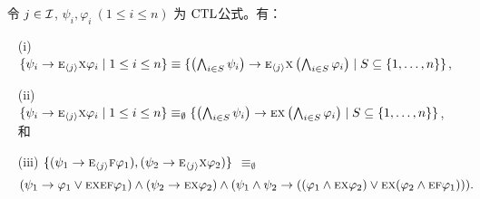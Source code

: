 \begin{lemma}~\label{lem:In2NI}
	令 $j\in {\cal I}$, $\psi_i,\varphi_i~(1\le i\le n)$ 为 $\textrm{CTL}$公式。有：
	\begin{itemize}
		\item[(i)] $\{\psi_i\rightarrow \textsc{e}_{{\langle{j}\rangle}} \textsc{x} \varphi_i \mid 1\le i\le n\}\equiv 
		\{\left(\bigwedge_{i\in S}\psi_i\right)\rightarrow \textsc{e}_{{\langle{j}\rangle}} \textsc{x} \left(\bigwedge_{i\in S}\varphi_i\right)\mid S\subseteq\{1,\dots, n\}\}$,
		
		\item[(ii)] $\{\psi_i\rightarrow \textsc{e}_{{\langle{j}\rangle}} \textsc{x} \varphi_i \mid 1\le i\le n\}\equiv_\emptyset
		\{\left(\bigwedge_{i\in S}\psi_i\right)\rightarrow \textsc{e} \textsc{x} \left(\bigwedge_{i\in S}\varphi_i\right)\mid S\subseteq\{1,\dots, n\}\}$, 和
		
		\item[(iii)] $\{(\psi_1 \rightarrow \textsc{e}_{{\langle{j}\rangle}}\textsc{f} \varphi_1), (\psi_2 \rightarrow \textsc{e}_{{\langle{j}\rangle}}\textsc{x} \varphi_2)\}$
		$\equiv_\emptyset$ 
		\begin{equation*}
			(\psi_1 \rightarrow \varphi_1 \vee \textsc{e} \textsc{x} \textsc{e} \textsc{f} \varphi_1)
			\wedge (\psi_2 \rightarrow \textsc{e} \textsc{x} \varphi_2)
			\wedge (\psi_1 \wedge \psi_2 \rightarrow ((\varphi_1 \wedge \textsc{e} \textsc{x} \varphi_2) \vee \textsc{e} \textsc{x} (\varphi_2 \wedge \textsc{e} \textsc{f} \varphi_1))).
		\end{equation*}
	\end{itemize}
\end{lemma}
